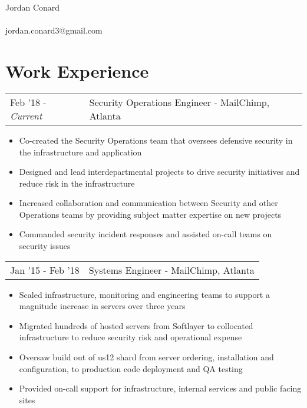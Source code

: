 \documentclass[letterpaper]{article}
\begin{document}
\pagestyle{empty} %


\begin{center}
    {\Huge Jordan Conard}\\~\\
    jordan.conard3@gmail.com\\
\end{center}

\section*{Work Experience}
\begin{tabular}{l|l}
{Feb '18 - \emph{Current}} & Security Operations Engineer - MailChimp, Atlanta
\end{tabular}
\begin{itemize}[noitemsep]
	\item Co-created the Security Operations team that oversees defensive security in the infrastructure and application
	\item Designed and lead interdepartmental projects to drive security initiatives and reduce risk in the infrastructure
	\item Increased collaboration and communication between Security and other Operations teams by providing subject matter expertise on new projects
	\item Commanded security incident responses and assisted on-call teams on security issues
\end{itemize}
\begin{tabular}{l|l}
{Jan '15 - Feb '18} & Systems Engineer - MailChimp, Atlanta\\
\end{tabular}
\begin{itemize}[noitemsep]
	\item Scaled infrastructure, monitoring and engineering teams to support a magnitude increase in servers over three years
	\item Migrated hundreds of hosted servers from Softlayer to collocated infrastructure to reduce security risk and operational expense
	\item Oversaw build out of us12 shard from server ordering, installation and configuration, to production code deployment and QA testing
	\item Provided on-call support for infrastructure, internal services and public facing sites
\end{itemize}
\end{document}
